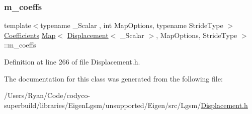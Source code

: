 \subsubsection{\texorpdfstring{m\+\_\+coeffs}{m\_coeffs}}
{\footnotesize\ttfamily template$<$typename \+\_\+\+Scalar , int Map\+Options, typename Stride\+Type $>$ \\
\hyperlink{class_map_3_01_displacement_3_01___scalar_01_4_00_01_map_options_00_01_stride_type_01_4_a3213feadb99e77889a832a1ef1e80b4b}{Coefficients} \hyperlink{class_map_3_01_displacement_3_01___scalar_01_4_00_01_map_options_00_01_stride_type_01_4_a7355e77dc9b91bd8cb68f20847318f0f}{Map}$<$ \hyperlink{class_displacement}{Displacement}$<$ \+\_\+\+Scalar $>$, Map\+Options, Stride\+Type $>$\+::m\+\_\+coeffs\hspace{0.3cm}{\ttfamily [protected]}}



Definition at line 266 of file Displacement.\+h.



The documentation for this class was generated from the following file\+:\begin{DoxyCompactItemize}
\item 
/\+Users/\+Ryan/\+Code/codyco-\/superbuild/libraries/\+Eigen\+Lgsm/unsupported/\+Eigen/src/\+Lgsm/\hyperlink{_displacement_8h}{Displacement.\+h}\end{DoxyCompactItemize}
